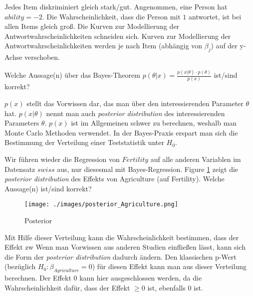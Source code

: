 \documentclass[10pt,addpoints]{exam}
\begin{document}
\begin{questions}
\begin{choices}
\CorrectChoice Jedes Item diskriminiert gleich stark/gut.
\choice Angenommen, eine Person hat $ability = -2$. Die Wahrscheinlichkeit, dass die Person mit $1$ antwortet, ist bei allen Items gleich groß.
\choice Die Kurven zur Modellierung der Antwortwahrscheinlichkeiten schneiden sich.
\choice Kurven zur Modellierung der Antwortwahrscheinlichkeiten werden je nach Item (abhängig von $\beta_j$) auf der y-Achse verschoben.
\end{choices}

\question Welche Aussage(n) über das Bayes-Theorem $p(\theta | x) = \frac{p(x | \theta) \cdot p(\theta)}{p(x)}$ ist/sind korrekt?

\begin{choices}
\choice $p(x)$ stellt das Vorwissen dar, das man über den interessierenden Parameter $\theta$ hat.
\choice $p(x | \theta)$ nennt man auch \textit{posterior distribution} des interessierenden Parameters $\theta$.
\CorrectChoice $p(x)$ ist im Allgemeinen schwer zu berechnen, weshalb man Monte Carlo Methoden verwendet.
\CorrectChoice In der Bayes-Praxis erspart man sich die Bestimmung der Verteilung einer Teststatistik unter $H_0$.
\end{choices}

\question Wir führen wieder die Regression von $Fertility$ auf alle anderen Variablen im Datensatz $swiss$ aus, nur diesesmal mit Bayes-Regression. Figure \ref{fig:posterior} zeigt die \textit{posterior distribution} des Effekts von Agriculture (auf Fertility). Welche Aussage(n) ist/sind korrekt?

\begin{figure}[H]
\centering
\texttt{[image: ./images/posterior\_Agriculture.png]}
\caption{Posterior}
\label{fig:posterior}
\end{figure}

\begin{choices}
\CorrectChoice Mit Hilfe dieser Verteilung kann die Wahrscheinlichkeit bestimmen, dass der Effekt zw
\CorrectChoice Wenn man Vorwissen aus anderen Studien einfließen lässt, kann sich die Form der \textit{posterior distribution} dadurch ändern.
\choice Den klassischen p-Wert (bezüglich $H_0: \beta_{Agriculture}=0$) für diesen Effekt kann man aus dieser Verteilung berechnen. 
\choice Der Effekt $0$ kann hier ausgeschlossen werden, da die Wahrscheinlichkeit dafür, dass der Effekt $\ge 0$ ist, ebenfalls $0$ ist.
\end{choices}


\end{questions}
\end{document}
